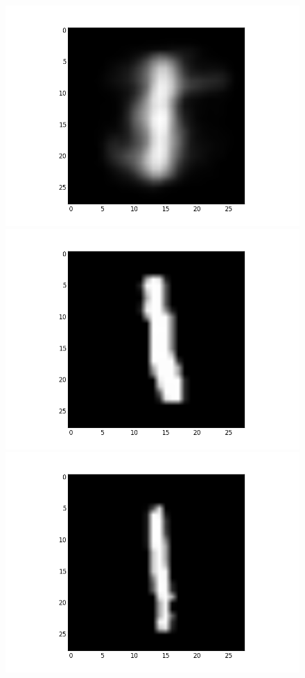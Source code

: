 \documentclass[submit]{harvardml}
\begin{document}
\begin{figure}[ht]
    \centering
    \includegraphics[scale=0.20]{K10-mean-8}
    \includegraphics[scale=0.20]{K10-representative-8-0}
    \includegraphics[scale=0.20]{K10-representative-8-1}

\end{figure}
\end{document}
